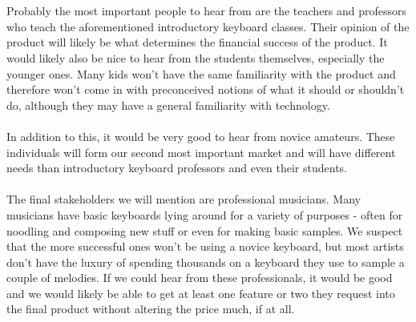 \documentclass{article}
\begin{document}
\begin{enumerate}
    \\
    \\
    Probably the most important people to hear from are the teachers and professors who teach the aforementioned introductory keyboard classes. Their opinion of the product will likely be what determines the financial success of the product. It would likely also be nice to hear from the students themselves, especially the younger ones. Many kids won't have the same familiarity with the product and therefore won't come in with preconceived notions of what it should or shouldn't do, although they may have a general familiarity with technology.
    \\
    \\
    In addition to this, it would be very good to hear from novice amateurs. These individuals will form our second most important market and will have different needs than introductory keyboard professors and even their students.
    \\
    \\
    The final stakeholders we will mention are professional musicians. Many musicians have basic keyboards lying around for a variety of purposes - often for noodling and composing new stuff or even for making basic samples. We suspect that the more successful ones won't be using a novice keyboard, but most artists don't have the luxury of spending thousands on a keyboard they use to sample a couple of melodies. If we could hear from these professionals, it would be good and we would likely be able to get at least one feature or two they request into the final product without altering the price much, if at all.
\end{enumerate}
\end{document}
